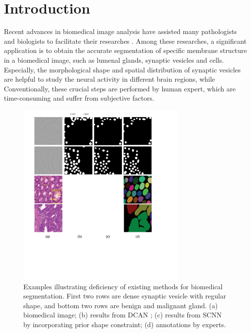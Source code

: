 \section{Introduction}
Recent advances in biomedical image analysis have assisted many pathologists and biologists to facilitate their researches \cite{Xu2016, Ronneberger2015,Chen2016c,Lieman-Sifry2017,Paszke2016}.
Among these researches, a significant application is to obtain the accurate segmentation of specific membrane structure in a biomedical image, such as lumenal glands, synaptic vesicles and cells.
Especially, the morphological shape and spatial distribution of synaptic vesicles are helpful to study the neural activity in different brain regions, while  
%
Conventionally, these crucial steps are performed by human expert, which are time-consuming and suffer from subjective factors.

\begin{figure}
\begin{center}
\includegraphics[width=3.3in]{figures/Fig1.pdf}
\end{center}
   \caption{Examples illustrating deficiency of existing methods for biomedical segmentation. First two rows are dense synaptic vesicle with regular shape, and bottom two rows are benign and malignant gland. (a) biomedical image; (b) results from DCAN ; (c) results from SCNN by incorporating prior shape constraint; (d) annotations by experts. }
   \label{FigImgs}
\end{figure}

